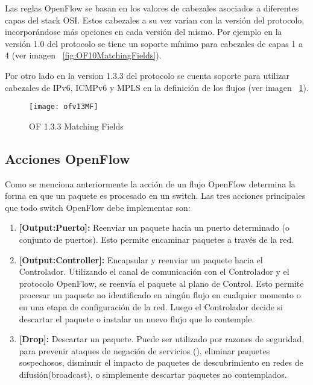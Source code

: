 Las reglas OpenFlow se basan en los valores de cabezales asociados a diferentes capas del stack OSI. Estos cabezales a su vez varían con la versi\'on del protocolo, incorporándose m\'as opciones en cada versi\'on del mismo. Por ejemplo en la versi\'on 1.0 del protocolo se tiene un soporte mínimo para cabezales de capas 1 a 4 (ver imagen ~\ref{fig:OF10MatchingFields}).

Por otro lado en la version 1.3.3 del protocolo se cuenta soporte para utilizar cabezales de IPv6, ICMPv6 y MPLS en la definición de los flujos (ver imagen ~\ref{fig:OF13MatchingFields}).
 
\begin{figure}[ht] 
\centering    
\texttt{[image: ofv13MF]}
\caption[OF 1.3.3 Matching Fields]{OF 1.3.3 Matching Fields}
\label{fig:OF13MatchingFields}
\end{figure}

\subsection{Acciones OpenFlow}

Como se menciona anteriormente la acci\'on de un flujo OpenFlow determina la forma en que un paquete es procesado en un switch. Las tres acciones principales que todo switch OpenFlow debe implementar son:

\begin{enumerate}
\item \textbf{[Output:Puerto]:} Reenviar un paquete hacia un puerto determinado (o conjunto de puertos). Esto permite encaminar paquetes a través de la red.

\item \textbf{[Output:Controller]:} Encapsular y reenviar un paquete hacia el Controlador. Utilizando el canal de comunicación con el Controlador y el protocolo OpenFlow, se reenvía el paquete al plano de Control. Esto permite procesar un paquete no identificado en ningún flujo en cualquier momento o en una etapa de configuración de la red. Luego el Controlador decide si descartar el paquete o instalar un nuevo flujo que lo contemple.

\item \textbf{[Drop]:} Descartar un paquete. Puede ser utilizado por razones de seguridad, para prevenir ataques de negación de servicios (), eliminar paquetes sospechosos, disminuir el impacto de paquetes de descubrimiento en redes de difusión(broadcast), o simplemente descartar paquetes no contemplados.
\end{enumerate}

